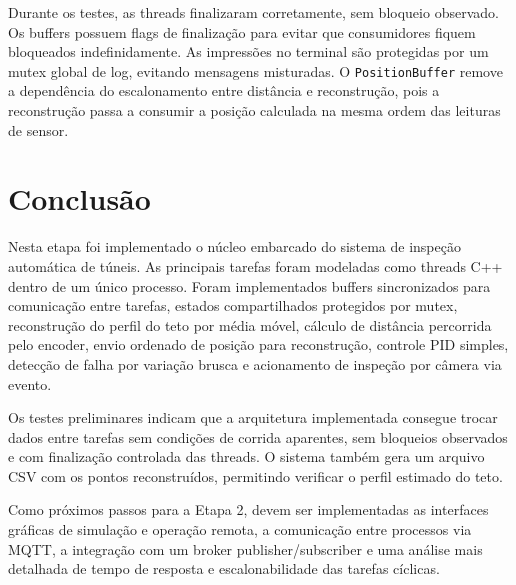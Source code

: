 \documentclass[12pt,a4paper]{article}
\begin{document}
    Durante os testes, as threads finalizaram corretamente, sem bloqueio observado. Os buffers possuem flags de finalização para evitar que consumidores fiquem bloqueados indefinidamente. As impressões no terminal são protegidas por um mutex global de log, evitando mensagens misturadas. O \texttt{PositionBuffer} remove a dependência do escalonamento entre distância e reconstrução, pois a reconstrução passa a consumir a posição calculada na mesma ordem das leituras de sensor.

    \section{Conclusão}

    Nesta etapa foi implementado o núcleo embarcado do sistema de inspeção automática de túneis. As principais tarefas foram modeladas como threads C++ dentro de um único processo. Foram implementados buffers sincronizados para comunicação entre tarefas, estados compartilhados protegidos por mutex, reconstrução do perfil do teto por média móvel, cálculo de distância percorrida pelo encoder, envio ordenado de posição para reconstrução, controle PID simples, detecção de falha por variação brusca e acionamento de inspeção por câmera via evento.

    Os testes preliminares indicam que a arquitetura implementada consegue trocar dados entre tarefas sem condições de corrida aparentes, sem bloqueios observados e com finalização controlada das threads. O sistema também gera um arquivo CSV com os pontos reconstruídos, permitindo verificar o perfil estimado do teto.

    Como próximos passos para a Etapa 2, devem ser implementadas as interfaces gráficas de simulação e operação remota, a comunicação entre processos via MQTT, a integração com um broker publisher/subscriber e uma análise mais detalhada de tempo de resposta e escalonabilidade das tarefas cíclicas.

    
\end{document}
